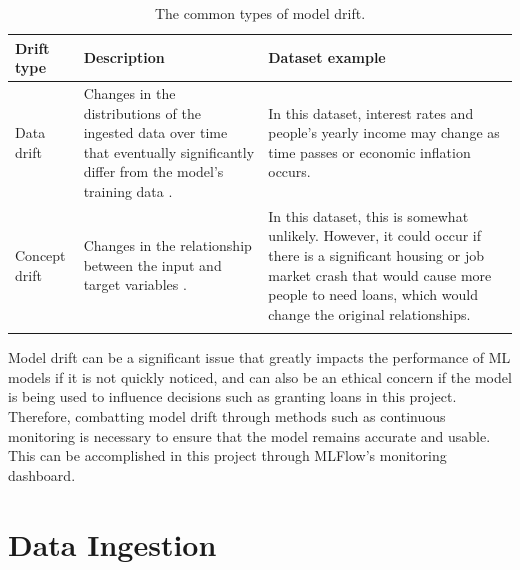 \documentclass[12pt]{report}
\newcommand{\para}{\vspace{7pt}\noindent}
\begin{document}
\begin{longtable}{ | p{} | p{} | p{} |}
    \hline
    \cellcolor{blue!25}Drift type & \cellcolor{blue!25}Description & \cellcolor{blue!25}Dataset example\\
    \hline
    Data drift & Changes in the distributions of the ingested data over time that eventually significantly differ from the model's training data \autocite{datacamp_understanding_nodate}.
    & In this dataset, interest rates and people's yearly income may change as time passes or economic inflation occurs.\\
    \hline
    Concept drift & Changes in the relationship between the input and target variables \autocite{nigenda_amazon_2022}. 
    & In this dataset, this is somewhat unlikely. However, it could occur if there is a significant housing or job market crash 
    that would cause more people to need loans, which would change the original relationships.\\
    \hline
\caption{The common types of model drift.}\label{tab:Drift}
\end{longtable}

\pagebreak %
\para Model drift can be a significant issue that greatly impacts the performance of ML models if it is not quickly noticed, and can 
also be an ethical concern if the model is being used to influence decisions such as granting loans in this project. 
Therefore, combatting model drift through methods such as continuous monitoring is necessary to ensure that the model remains accurate 
and usable. This can be accomplished in this project through MLFlow's monitoring dashboard.








\section{Data Ingestion}\label{sec:ImpIngestion}
\end{document}
